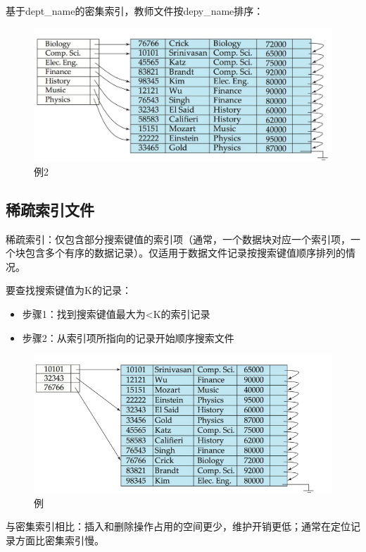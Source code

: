 基于dept\_name的密集索引，教师文件按depy\_name排序：

\begin{figure}[H]
    \centering
    \includegraphics[width=0.9\linewidth]{image2.png}
    \caption{例2}
    \label{}
\end{figure}

\subsection{稀疏索引文件}

稀疏索引：仅包含部分搜索键值的索引项（通常，一个数据块对应一个索引项，一个块包含多个有序的数据记录）。仅适用于数据文件记录按搜索键值顺序排列的情况。

要查找搜索键值为K的记录：

\begin{itemize}
    \item 步骤1：找到搜索键值最大为<K的索引记录
    \item 步骤2：从索引项所指向的记录开始顺序搜索文件
\end{itemize}

\begin{figure}[H]
    \centering
    \includegraphics[width=0.9\linewidth]{image3.png}
    \caption{例}
    \label{}
\end{figure}

与密集索引相比：插入和删除操作占用的空间更少，维护开销更低；通常在定位记录方面比密集索引慢。

